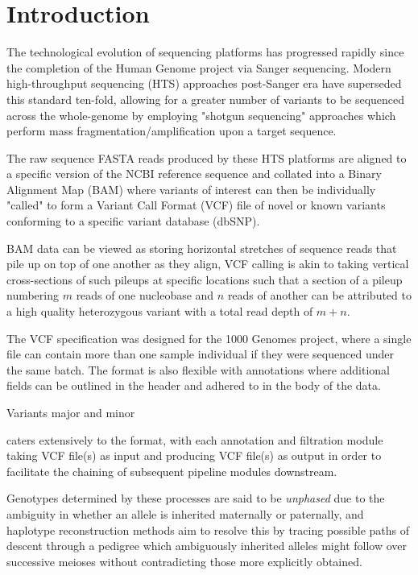 
\section{Introduction}

\enlargethispage{30pt}

The technological evolution of sequencing platforms has progressed rapidly since the completion of the Human Genome project via Sanger sequencing. Modern high-throughput sequencing (HTS) approaches post-Sanger era have superseded this standard ten-fold, allowing for a greater number of variants to be sequenced across the whole-genome by employing "shotgun sequencing" approaches which perform mass fragmentation/amplification upon a target sequence.

The raw sequence FASTA reads produced by these HTS platforms are aligned to a specific version of the NCBI reference sequence and collated into a Binary Alignment Map (BAM) where variants of interest can then be individually "called" to form a Variant Call Format (VCF) file of novel or known variants conforming to a specific variant database (dbSNP).

BAM data can be viewed as storing horizontal stretches of sequence reads that pile up on top of one another as they align, VCF calling is akin to taking vertical cross-sections of such pileups at specific locations such that a section of a pileup numbering $m$ reads of one nucleobase and $n$ reads of another can be attributed to a high quality heterozygous variant with a total read depth of $m + n$.

The VCF specification was designed for the 1000 Genomes project, where a single file can contain more than one sample individual if they were  sequenced under the same batch. The format is also flexible with annotations where additional fields can be outlined in the header and adhered to in the body of the data. 

Variants major and minor 

\app caters extensively to the format, with each annotation and filtration module taking VCF file(s) as input and producing VCF file(s) as output in order to facilitate the chaining of subsequent pipeline modules downstream.






Genotypes determined by these processes are said to be \textit{unphased} due to the ambiguity in whether an allele is inherited maternally or paternally, and haplotype reconstruction methods aim to resolve this by tracing possible paths of descent through a pedigree which ambiguously inherited alleles might follow over successive meioses without contradicting those more explicitly obtained.

